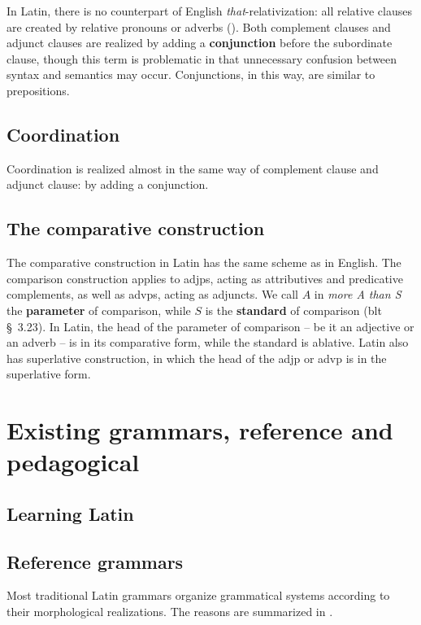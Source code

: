 \documentclass{article}
\newcommand*{\citesec}[1]{\S~{#1}}
\newcommand*{\concept}[1]{\textbf{#1}}
\newcommand*{\corpus}[1]{\emph{#1}}
\begin{document}
In Latin, there is no counterpart of English \corpus{that}-relativization:
all relative clauses are created by relative pronouns or adverbs ().
Both complement clauses and adjunct clauses are realized 
by adding a \concept{conjunction} before the subordinate clause,
though this term is problematic in that unnecessary confusion between syntax and semantics may occur.
Conjunctions, in this way, are similar to prepositions.

\subsection{Coordination}\label{sec:coordination-abs}

Coordination is realized almost in the same way of complement clause and adjunct clause:
by adding a conjunction.

\subsection{The comparative construction}\label{sec:compare-abs}

The comparative construction in Latin has the same scheme as in English.
The comparison construction applies to \ac{adjp}s, 
acting as attributives and predicative complements,
as well as \ac{advp}s,
acting as adjuncts.
We call $A$ in \corpus{more A than S} the \concept{parameter} of comparison,
while $S$ is the \concept{standard} of comparison (\ac{blt} \citesec{3.23}).
In Latin, the head of the parameter of comparison -- be it an adjective or an adverb -- 
is in its comparative form,
while the standard is ablative.
Latin also has superlative construction, 
in which the head of the \ac{adjp} or \ac{advp} is in the superlative form.

\section{Existing grammars, reference and pedagogical}

\subsection{Learning Latin}

\subsection{Reference grammars}

Most traditional Latin grammars organize grammatical systems according to their morphological realizations.
The reasons are summarized in .
\end{document}
